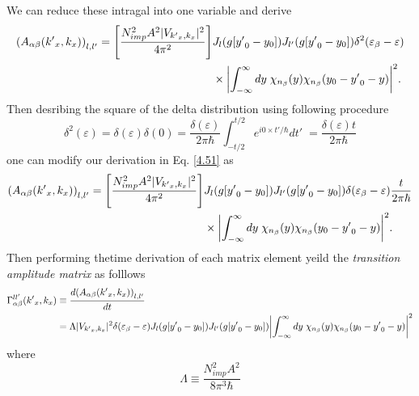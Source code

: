 \noindent
We can reduce these intragal into one variable and derive
\begin{equation} \label{4.52}
  \begin{aligned}
      \qty(A_{\alpha\beta}({k'}_x,k_x))_{l,l'} =
      \qty[\frac { N_{imp}^2 A^2 |V_{{k'}_x,k_x}|^2}{4\pi^2}] &
      J_l\qty(g[{y'}_0 - y_0]) J_{l'}\qty(g[{y'}_0 - y_0])
      \delta^2(\varepsilon_{\beta} - \varepsilon) \\
      & \times
      \qty|
      \int_{-\infty}^{\infty} dy \;
      {\chi}_{n_{\beta}}\qty(y)
      {\chi}_{n_{\beta}}\qty(y_0 - {y'}_0 - y)|^2.
  \end{aligned}
\end{equation}
Then desribing the square of the delta distribution using following procedure
\begin{equation} \label{4.53}
    \delta^2(\varepsilon) =
    \delta(\varepsilon)\delta(0) =
    \frac{\delta(\varepsilon)}{2\pi \hbar}
    \int_{-t/2}^{t/2} e^{i0\times t'/\hbar} dt'\; =
    \frac{\delta(\varepsilon)t}{2\pi \hbar}
\end{equation}
one can modify our derivation in Eq. \eqref{4.51} as
\begin{equation} \label{4.54}
  \begin{aligned}
      \qty(A_{\alpha\beta}({k'}_x,k_x))_{l,l'} =
      \qty[\frac { N_{imp}^2 A^2 |V_{{k'}_x,k_x}|^2}{4\pi^2}] &
      J_l\qty(g[{y'}_0 - y_0]) J_{l'}\qty(g[{y'}_0 - y_0])
      \delta(\varepsilon_{\beta} - \varepsilon)
      \frac{t}{2\pi \hbar}\\
      & \times
      \qty|
      \int_{-\infty}^{\infty} dy \;
      {\chi}_{n_{\beta}}\qty(y)
      {\chi}_{n_{\beta}}\qty(y_0 - {y'}_0 - y)|^2.
  \end{aligned}
\end{equation}
Then performing thetime derivation of each matrix element yeild the \textit{transition amplitude matrix} as folllows
\begin{equation} \label{4.55}
  \begin{aligned}
    \Gamma_{\alpha\beta}^{ll'}({k'}_x,k_x) &  \equiv
    \frac{d \qty(A_{\alpha\beta}({k'}_x,k_x))_{l,l'}}{dt} \\
    & =
    \Lambda |V_{{k'}_x,k_x}|^2
    \delta(\varepsilon_{\beta} - \varepsilon)
    J_l\qty(g[{y'}_0 - y_0]) J_{l'}\qty(g[{y'}_0 - y_0])
    \qty|
    \int_{-\infty}^{\infty} dy \;
    {\chi}_{n_{\beta}}\qty(y)
    {\chi}_{n_{\beta}}\qty(y_0 - {y'}_0 - y)|^2
  \end{aligned}
\end{equation}
where
\begin{equation} \label{4.56}
    \Lambda \equiv
    \frac { N_{imp}^2 A^2}{8\pi^3 \hbar}
\end{equation}

